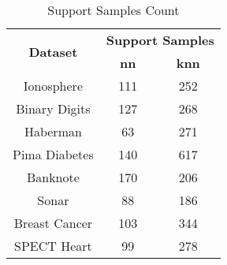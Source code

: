 \begin{table}[htbp]
\caption{Support Samples Count}
\begin{center}
\begin{tabular}{|c|c|c|}
\hline
\multirow{2}{*}{\textbf{Dataset}} & \multicolumn{2}{c|}{\textbf{Support Samples}} \\ \cline{2-3}
 & \textbf{nn} & \textbf{knn} \\ \hline
Ionosphere & 111 & 252 \\ \hline
Binary Digits & 127 & 268 \\ \hline
Haberman & 63 & 271 \\ \hline
Pima Diabetes & 140 & 617 \\ \hline
Banknote & 170 & 206 \\ \hline
Sonar & 88 & 186 \\ \hline
Breast Cancer & 103 & 344 \\ \hline
SPECT Heart & 99 & 278 \\ \hline
\end{tabular}
\label{tab:support}
\end{center}
\end{table}